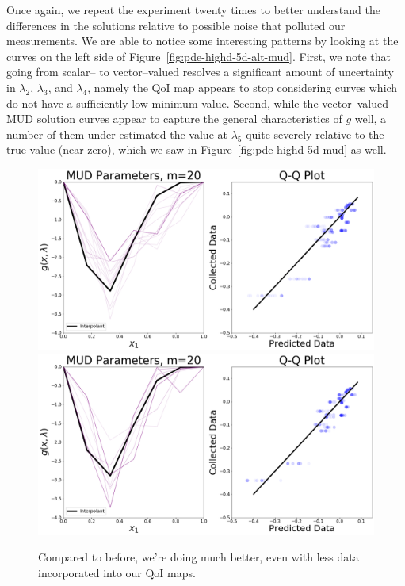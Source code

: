 Once again, we repeat the experiment twenty times to better understand the differences in the solutions relative to possible noise that polluted our measurements.
We are able to notice some interesting patterns by looking at the curves on the left side of Figure~\ref{fig:pde-highd-5d-alt-mud}.
First, we note that going from scalar-- to vector--valued resolves a significant amount of uncertainty in $\lambda_2$, $\lambda_3$, and $\lambda_4$, namely the QoI map appears to stop considering curves which do not have a sufficiently low minimum value.
Second, while the vector--valued MUD solution curves appear to capture the general characteristics of $g$ well, a number of them under-estimated the value at $\lambda_5$ quite severely relative to the true value (near zero), which we saw in Figure~\ref{fig:pde-highd-5d-mud} as well.

\begin{figure}[htbp]
\centering
  \includegraphics[width=0.95\linewidth]{figures/pde-highd/pde-highd_pair_D-alt-5-1_m20.png}
  \includegraphics[width=0.95\linewidth]{figures/pde-highd/pde-highd_pair_D-alt-5-5_m20.png}
\caption{Compared to before, we're doing much better, even with less data incorporated into our QoI maps.}
\label{fig:pde-highd-5d-alt-mud-20}
\end{figure}

